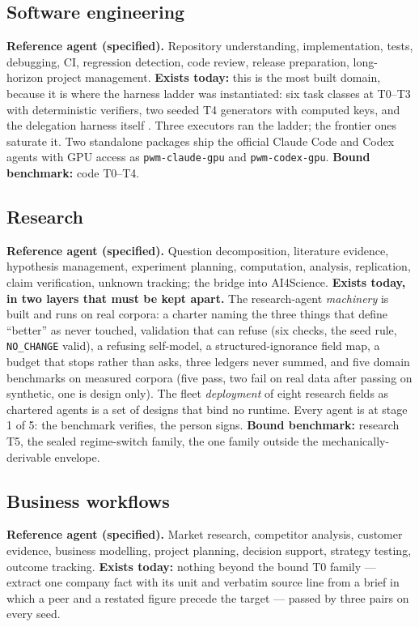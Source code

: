 \subsection{Software engineering}

\textbf{Reference agent (specified).} Repository understanding, implementation, tests, debugging, CI, regression detection, code review, release preparation, long-horizon project management. \textbf{Exists today:} this is the most built domain, because it is where the harness ladder was instantiated: six task classes at T0--T3 with deterministic verifiers, two seeded T4 generators with computed keys, and the delegation harness itself \citep{yang2026harness}. Three executors ran the ladder; the frontier ones saturate it. Two standalone packages ship the official Claude Code and Codex agents with GPU access as \texttt{pwm-claude-gpu} and \texttt{pwm-codex-gpu}. \textbf{Bound benchmark:} code T0--T4.

\subsection{Research}

\textbf{Reference agent (specified).} Question decomposition, literature evidence, hypothesis management, experiment planning, computation, analysis, replication, claim verification, unknown tracking; the bridge into AI4Science. \textbf{Exists today, in two layers that must be kept apart.} The research-agent \emph{machinery} is built and runs on real corpora: a charter naming the three things that define ``better'' as never touched, validation that can refuse (six checks, the seed rule, \texttt{NO\_CHANGE} valid), a refusing self-model, a structured-ignorance field map, a budget that stops rather than asks, three ledgers never summed, and five domain benchmarks on measured corpora (five pass, two fail on real data after passing on synthetic, one is design only). The fleet \emph{deployment} of eight research fields as chartered agents is a set of designs that bind no runtime. Every agent is at stage 1 of 5: the benchmark verifies, the person signs. \textbf{Bound benchmark:} research T5, the sealed regime-switch family, the one family outside the mechanically-derivable envelope.

\subsection{Business workflows}

\textbf{Reference agent (specified).} Market research, competitor analysis, customer evidence, business modelling, project planning, decision support, strategy testing, outcome tracking. \textbf{Exists today:} nothing beyond the bound T0 family --- extract one company fact with its unit and verbatim source line from a brief in which a peer and a restated figure precede the target --- passed by three pairs on every seed.

